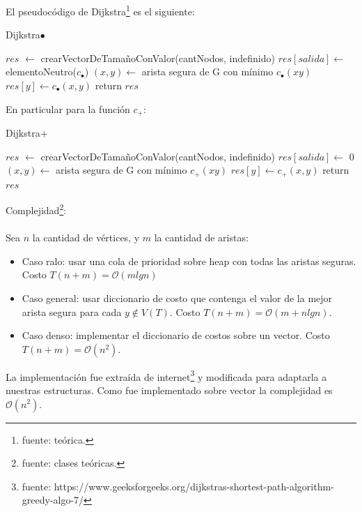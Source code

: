 \indent El pseudocódigo de Dijkstra\footnote{fuente: teórica.} es el siguiente:
\begin{algorithm}[H]
\caption{Dijkstra$\bullet$}
\label{$Dijkstra$}
\begin{algorithmic}[1]
\State $res$ $\gets$ crearVectorDeTama\~noConValor(cantNodos, indefinido)
\State $res[salida] \gets$ elementoNeutro($c_{\bullet}$)
\State $(x,y) \gets$ arista segura de G con mínimo $c_{\bullet}(xy)$  
\State $res[y] \gets c_{\bullet}(x,y)$
\EndFor
\State return $res$
\EndProcedure
\end{algorithmic}
\end{algorithm}

\indent En particular para la función $c_{+}$:
\begin{algorithm}[H]
\caption{Dijkstra+}
\label{$Dijkstra$}
\begin{algorithmic}[1]
\State $res$ $\gets$ crearVectorDeTama\~noConValor(cantNodos, indefinido)
\State $res[salida] \gets$ 0
\State $(x,y) \gets$ arista segura de G con mínimo $c_{+}(xy)$ 
\State $res[y] \gets c_{+}(x,y)$						
\EndFor
\State return $res$
\EndProcedure
\end{algorithmic}
\end{algorithm}

\indent Complejidad\footnote{fuente: clases teóricas.}: \\ \\
\indent Sea $n$ la cantidad de vértices, y $m$ la cantidad de aristas:
\begin{itemize}
\item Caso ralo: usar una cola de prioridad sobre heap con todas las aristas seguras. Costo $T(n + m) =  \mathcal{O}(mlgn)$
\item Caso general: usar diccionario de costo que contenga el valor de la mejor arista segura para cada $y \notin  V (T)$. Costo $T(n + m) = \mathcal{O}(m+nlgn)$.
\item Caso denso: implementar el diccionario de costos sobre un vector. Costo $T(n + m) = \mathcal{O}(n^{2}).$
\end{itemize}

\indent La implementación fue extraída de internet\footnote{fuente: https://www.geeksforgeeks.org/dijkstras-shortest-path-algorithm-greedy-algo-7/} y modificada para adaptarla a nuestras estructuras. Como fue implementado sobre vector la complejidad es $\mathcal{O}(n^{2})$. \\

